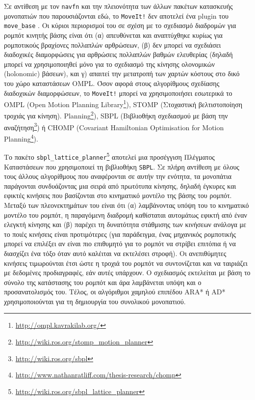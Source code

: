 Σε αντίθεση με τον \texttt{navfn} και την πλειονότητα των άλλων πακέτων
κατασκευής μονοπατιών που παρουσιάζονται εδώ, το \texttt{MoveIt!} δεν αποτελεί
ένα plugin του \texttt{move\_base} \cite{Chitta2012}. Οι κύριοι περιορισμοί του
σε σχέση με το σχεδιασμό διαδρομών για ρομπότ κινητής βάσης είναι ότι (α)
απευθύνεται και αναπτύχθηκε κυρίως για ρομποτικούς βραχίονες πολλαπλών
αρθρώσεων, (β) δεν μπορεί να σχεδιάσει διαδοχικές διαμορφώσεις για αρθρώσεις
πολλαπλών βαθμών ελευθερίας (δηλαδή μπορεί να χρησιμοποιηθεί μόνο για το
σχεδιασμό της κίνησης ολονομικών (holonomic) βάσεων), και γ) απαιτεί
την μετατροπή των χαρτών κόστους στο δικό του χώρο καταστάσεων OMPL. Όσον
αφορά στους αλγορίθμους σχεδίασης διαδοχικών διαμορφώσεων, το \texttt{MoveIt!}
μπορεί να χρησιμοποιήσει εσωτερικά το OMPL (Open Motion Planning
Library\footnote{\url{http://ompl.kavrakilab.org/}}), STOMP (Στοχαστική
βελτιστοποίηση τροχιάς για κίνηση).
Planning\footnote{\url{http://wiki.ros.org/stomp\_motion\_planner}}), SBPL
(Βιβλιοθήκη σχεδιασμού με βάση την
αναζήτηση\footnote{\url{http://wiki.ros.org/sbpl}}) ή CHOMP (Covariant
Hamiltonian Optimisation for Motion
Planning\footnote{\url{http://www.nathanratliff.com/thesis-research/chomp}}).

Το πακέτο
\texttt{sbpl\_lattice\_planner}\footnote{\url{http://wiki.ros.org/sbpl\_lattice\_planner}}
αποτελεί μια προσέγγιση Πλέγματος Καταστάσεων \cite{MikhailPivtoraiko2005} που
χρησιμοποιεί τη βιβλιοθήκη \texttt{SBPL}. Σε πλήρη αντίθεση με όλους τους
άλλους αλγορίθμους που αναφέρονται σε αυτήν την ενότητα, τα μονοπάτια
παράγονται συνδυάζοντας μια σειρά από πρωτότυπα κίνησης, δηλαδή έγκυρες και
εφικτές κινήσεις που βασίζονται στο κινηματικό μοντέλο της βάσης του ρομπότ.
Μεταξύ των πλεονεκτημάτων του είναι ότι (α) λαμβάνοντας υπόψη του το κινηματικό
μοντέλο του ρομπότ, η παραγόμενη διαδρομή καθίσταται αυτομάτως εφικτή από έναν
ελεγκτή κίνησης και (β) παρέχει τη δυνατότητα στάθμισης των κινήσεων ανάλογα με
το ποιές κινήσεις είναι προτιμότερες (για παράδειγμα, ένας μηχανικός ρομποτικής
μπορεί να επιλέξει αν είναι πιο επιθυμητό για το ρομπότ να στρίβει επιτόπια ή
να διασχίζει ένα τόξο όταν αυτό καλέιται να εκτελέσει στροφή). Οι ανεπιθύμητες
κινήσεις τιμωρούνται έτσι ώστε η τροχιά του ρομπότ να συντονίζεται και να
ταιριάζει με δεδομένες προδιαγραφές, εάν αυτές υπάρχουν. Ο σχεδιασμός
εκτελείται με βάση το σύνολο της κατάστασης του ρομπότ και άρα λαμβάνεται υπόψη
και ο προσανατολισμός του.  Τέλος, οι αλγόριθμοι χαμηλού επιπέδου ARA*
\cite{Maxim2003} ή AD* \cite{Maxim2005} χρησιμοποιούνται για τη δημιουργία του
συνολικού μονοπατιού.

